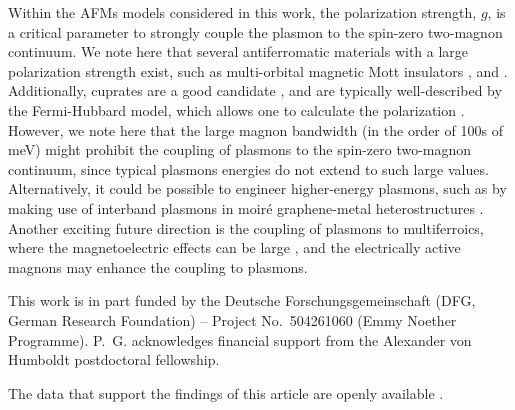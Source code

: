 \documentclass[aps,prb,reprint,twocolumns,superscriptaddress,nofootinbib]{revtex4-2}
\begin{document}
	Within the AFMs models considered in this work, the polarization strength, $g$, is a critical parameter to strongly couple the plasmon to the spin-zero two-magnon continuum. We note here that several antiferromatic materials with a large polarization strength exist, such as multi-orbital magnetic Mott insulators \cite{bolensTheoryElectronicMagnetoelectric2018},  \cite{seifertOpticalExcitationMagnons2019} and  \cite{mostovoyTemperatureDependentMagnetoelectricEffect2010}. Additionally, cuprates are a good candidate \cite{curtisCavityMagnonpolaritonsCuprate2022,shanDynamicMagneticPhase2024}, and are typically well-described by the Fermi-Hubbard model, which allows one to calculate the polarization \cite{zhuSpinorbitCouplingElectronic2014}. However, we note here that the large magnon bandwidth (in the order of 100s of meV) might prohibit the coupling of plasmons to the spin-zero two-magnon continuum, since typical plasmons energies do not extend to such large values. Alternatively, it could be possible to engineer higher-energy plasmons, such as by making use of interband plasmons in moir\'e graphene-metal heterostructures \cite{politanoEffectMoireSuperlattice2017}. Another exciting future direction is the coupling of plasmons to multiferroics, where the magnetoelectric effects can be large \cite{kimuraMagneticControlFerroelectric2003, wangEpitaxialBiFeO3Multiferroic2003}, and the electrically active magnons \cite{katsuraDynamicalMagnetoelectricCoupling2007, pimenovPossibleEvidenceElectromagnons2006, sushkovElectromagnonsMultiferroicYMn2O52007} may enhance the coupling to plasmons.
	
	
	
	
	\begin{acknowledgments}
		This work is in part funded by the Deutsche Forschungsgemeinschaft (DFG, German Research Foundation) -- Project No.~504261060 (Emmy Noether Programme). P.~G. acknowledges financial support from the Alexander von Humboldt postdoctoral fellowship.
	\end{acknowledgments}
	The data that support the findings of this article are openly available \cite{pgunninkPgunninkMagnonplasmonlifetimeV12025}.
	
	
	\appendix
	
\end{document}
